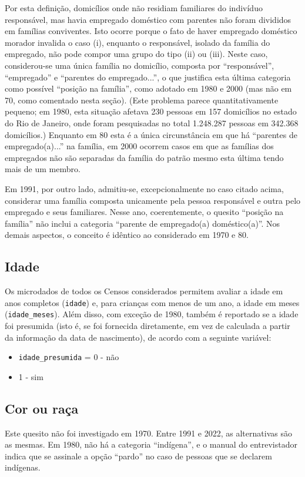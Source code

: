\documentclass[12pt,a4paper]{article}
\newcommand{\vr}[1]{\texttt{#1}}
\begin{document}
Por esta definição, domicílios onde não residiam familiares do indivíduo responsável, mas havia empregado doméstico com parentes não foram divididos em famílias conviventes. Isto ocorre porque o fato de haver empregado doméstico morador invalida o caso (i), enquanto o responsável, isolado da família do empregado, não pode compor uma grupo do tipo (ii) ou (iii). Neste caso, considerou-se uma única família no domicílio, composta por “responsável”, “empregado” e “parentes do empregado...”, o que justifica esta última categoria como possível “posição na família”, como adotado em 1980 e 2000 (mas não em 70, como comentado nesta seção). (Este problema parece quantitativamente pequeno; em 1980, esta situação afetava 230 pessoas em 157 domicílios no estado do Rio de Janeiro, onde foram pesquisadas no total 1.248.287 pessoas em 342.368 domicílios.) Enquanto em 80 esta é a única circunstância em que há “parentes de empregado(a)...” na família, em 2000 ocorrem casos em que as famílias dos empregados não são separadas da família do patrão mesmo esta última tendo mais de um membro.

Em 1991, por outro lado, admitiu-se, excepcionalmente no caso citado acima, considerar uma família composta unicamente pela pessoa responsável e outra pelo empregado e seus familiares. Nesse ano, coerentemente, o quesito “posição na família” não inclui a categoria “parente de empregado(a) doméstico(a)”. Nos demais aspectos, o conceito é idêntico ao considerado em 1970 e 80.

\subsection{Idade}\label{sec:d3}
Os microdados de todos os Censos considerados permitem avaliar a idade em anos completos (\vr{idade}) e, para crianças com menos de um ano, a idade em meses (\vr{idade\_meses}). Além disso, com exceção de 1980, também é reportado se a idade foi presumida (isto é, se foi fornecida diretamente, em vez de calculada a partir da informação da data de nascimento), de acordo com a seguinte variável:
\begin{itemize}
  \item \vr{idade\_presumida} = 0 - não
  \item 1 - sim
\end{itemize}

\subsection{Cor ou raça}\label{sec:d4}
Este quesito não foi investigado em 1970. Entre 1991 e 2022, as alternativas são as mesmas. Em 1980, não há a categoria “indígena”, e o manual do entrevistador indica que se assinale a opção “pardo” no caso de pessoas que se declarem indígenas.
\end{document}
